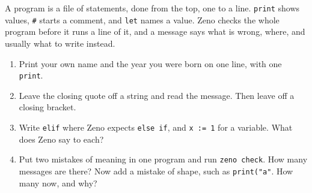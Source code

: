 \begin{summary}
A program is a file of statements, done from the top, one to a line.
\verb|print| shows values, \verb|#| starts a comment, and \verb|let|
names a value. Zeno checks the whole program before it runs a line of
it, and a message says what is wrong, where, and usually what to write
instead.
\end{summary}

\begin{tryit}
\begin{enumerate}
\item Print your own name and the year you were born on one line,
  with one \verb|print|.
\item Leave the closing quote off a string and read the message. Then
  leave off a closing bracket.
\item Write \verb|elif| where Zeno expects \verb|else if|, and
  \verb|x := 1| for a variable. What does Zeno say to each?
\item Put two mistakes of meaning in one program and run
  \verb|zeno check|. How many messages are there? Now add a mistake of
  shape, such as \verb|print("a"|. How many now, and why?
\end{enumerate}
\end{tryit}
